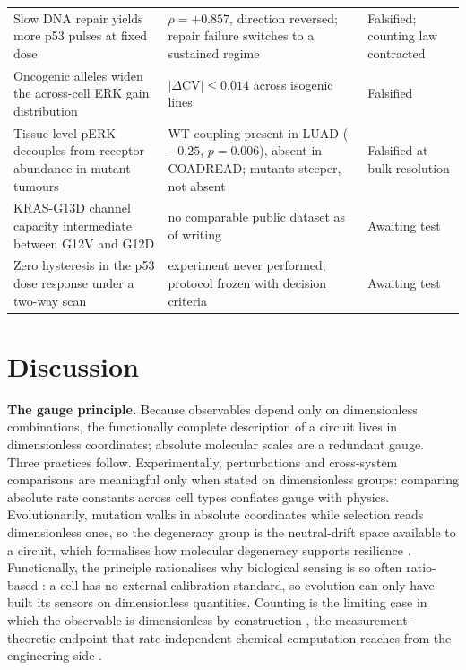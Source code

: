 \documentclass[11pt,a4paper]{article}
\begin{document}
\begin{table}[!tbp]
\begin{tabular}{@{}p{5.4cm}p{4.0cm}p{3.0cm}@{}}
Slow DNA repair yields more p53 pulses at fixed dose & $\rho=+0.857$, direction reversed; repair failure switches to a sustained regime & Falsified; counting law contracted \\
Oncogenic alleles widen the across-cell ERK gain distribution & $|\Delta\mathrm{CV}|\le0.014$ across isogenic lines & Falsified \\
Tissue-level pERK decouples from receptor abundance in mutant tumours & WT coupling present in LUAD ($-0.25$, $p=0.006$), absent in COADREAD; mutants steeper, not absent & Falsified at bulk resolution \\
KRAS-G13D channel capacity intermediate between G12V and G12D & no comparable public dataset as of writing & Awaiting test \\
Zero hysteresis in the p53 dose response under a two-way scan & experiment never performed; protocol frozen with decision criteria \cite{CompanionP53} & Awaiting test \\
\bottomrule
\end{tabular}
\end{table}

\section{Discussion}

\textbf{The gauge principle.} Because observables depend only on dimensionless combinations, the functionally complete description of a circuit lives in dimensionless coordinates; absolute molecular scales are a redundant gauge. Three practices follow. Experimentally, perturbations and cross-system comparisons are meaningful only when stated on dimensionless groups: comparing absolute rate constants across cell types conflates gauge with physics. Evolutionarily, mutation walks in absolute coordinates while selection reads dimensionless ones, so the degeneracy group is the neutral-drift space available to a circuit, which formalises how molecular degeneracy supports resilience \cite{Prinz2004,Goaillard2021}. Functionally, the principle rationalises why biological sensing is so often ratio-based \cite{Goentoro2009iFFL,Adler2018,Bergmann2010}: a cell has no external calibration standard, so evolution can only have built its sensors on dimensionless quantities. Counting is the limiting case in which the observable is dimensionless by construction \cite{Vogelstein1999,Guo2026}, the measurement-theoretic endpoint \cite{Krantz1971} that rate-independent chemical computation reaches from the engineering side \cite{Chen2023}.
\end{document}
